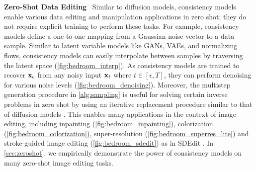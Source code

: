 \textbf{Zero-Shot Data Editing}~ Similar to diffusion models, consistency models enable various data editing and manipulation applications in zero shot; they do not require explicit training to perform these tasks. For example, consistency models define a one-to-one mapping from a Gaussian noise vector to a data sample. Similar to latent variable models like GANs, VAEs, and normalizing flows, consistency models can easily interpolate between samples by traversing the latent space (\cref{fig:bedroom_interp}). As consistency models are trained to recover ${\mathbf{x}}_\epsilon$ from any noisy input ${\mathbf{x}}_t$ where $t \in [\epsilon, T]$, they can perform denoising for various noise levels (\cref{fig:bedroom_denoising}). Moreover, the multistep generation procedure in \cref{alg:sampling} is useful for solving certain inverse problems in zero shot by using an iterative replacement procedure similar to that of diffusion models \cite{song2019generative,song2021scorebased,ho2022video}. This enables many applications in the context of image editing, including inpainting (\cref{fig:bedroom_inpainting}), colorization (\cref{fig:bedroom_colorization}), super-resolution (\cref{fig:bedroom_superres_lite}) and stroke-guided image editing (\cref{fig:bedroom_sdedit}) as in SDEdit \cite{meng2021sdedit}. In \cref{sec:zeroshot}, we empirically demonstrate the power of consistency models on many zero-shot image editing tasks.

